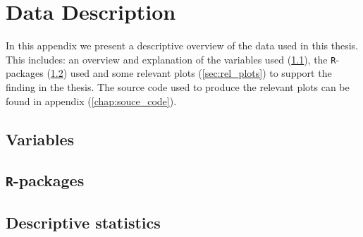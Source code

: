 \documentclass[../thesis.tex]{subfiles}
\begin{document}
\appendix

\chapter{Data Description}
\label{chap:data_desc}

\noindent In this appendix we present a descriptive overview of the data used in this thesis. This includes: an overview and explanation of the variables used (\ref{sec:variables}), the \texttt{R}-packages (\ref{sec:r_pack}) used and some relevant plots (\ref{sec:rel_plots}) to support the finding in the thesis. The source code used to produce the relevant plots can be found in appendix (\ref{chap:souce_code}).  

\section{Variables}
\label{sec:variables}



\section{\texttt{R}-packages}
\label{sec:r_pack}



\newpage

\section{Descriptive statistics}
\label{sec:desc_stat}





\newpage



\newpage



\newpage



\newpage



\newpage


\end{document}
